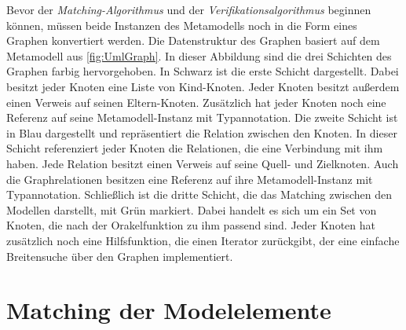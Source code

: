 Bevor der \emph{Matching-Algorithmus} und der \emph{Verifikationsalgorithmus} beginnen können, müssen beide Instanzen des Metamodells noch in die Form eines Graphen konvertiert werden.
Die Datenstruktur des Graphen basiert auf dem Metamodell aus \cref{fig:UmlGraph}.
In dieser Abbildung sind die drei Schichten des Graphen farbig hervorgehoben.
In Schwarz ist die erste Schicht dargestellt.
Dabei besitzt jeder Knoten eine Liste von Kind-Knoten.
Jeder Knoten besitzt außerdem einen Verweis auf seinen Eltern-Knoten.
Zusätzlich hat jeder Knoten noch eine Referenz auf seine Metamodell-Instanz mit Typannotation.
Die zweite Schicht ist in Blau dargestellt und repräsentiert die Relation zwischen den Knoten.
In dieser Schicht referenziert jeder Knoten die Relationen, die eine Verbindung mit ihm haben.
Jede Relation besitzt einen Verweis auf seine Quell- und Zielknoten.
Auch die Graphrelationen besitzen eine Referenz auf ihre Metamodell-Instanz mit Typannotation.
Schließlich ist die dritte Schicht, die das Matching zwischen den Modellen darstellt, mit Grün markiert.
Dabei handelt es sich um ein Set von Knoten, die nach der Orakelfunktion zu ihm passend sind.
Jeder Knoten hat zusätzlich noch eine Hilfsfunktion, die einen Iterator zurückgibt, der eine einfache Breitensuche über den Graphen implementiert.

\section{Matching der Modelelemente}
\label{sec:matching_model_elements}

